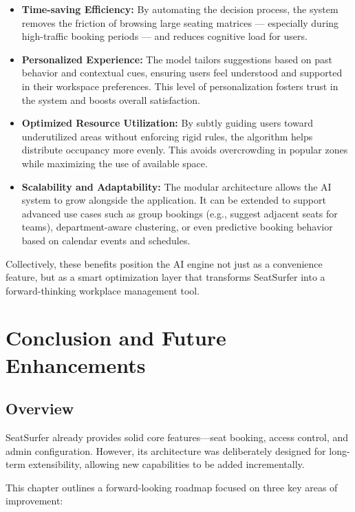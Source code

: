 \documentclass[12pt,a4paper]{report} %
\begin{document}
\begin{itemize}
\item \textbf{Time-saving Efficiency:}
By automating the decision process, the system removes the friction of browsing large seating matrices — especially during high-traffic booking periods — and reduces cognitive load for users.
\item \textbf{Personalized Experience:}  
The model tailors suggestions based on past behavior and contextual cues, ensuring users feel understood and supported in their workspace preferences. This level of personalization fosters trust in the system and boosts overall satisfaction.
\item \textbf{Optimized Resource Utilization:}  
By subtly guiding users toward underutilized areas without enforcing rigid rules, the algorithm helps distribute occupancy more evenly. This avoids overcrowding in popular zones while maximizing the use of available space.
\item \textbf{Scalability and Adaptability:}  
The modular architecture allows the AI system to grow alongside the application. It can be extended to support advanced use cases such as group bookings (e.g., suggest adjacent seats for teams), department-aware clustering, or even predictive booking behavior based on calendar events and schedules.
\end{itemize}

Collectively, these benefits position the AI engine not just as a convenience feature, but as a smart optimization layer that transforms SeatSurfer into a forward-thinking workplace management tool.

\newpage

\chapter*{Conclusion and Future Enhancements}

\section*{Overview}

SeatSurfer already provides solid core features—seat booking, access control, and admin configuration. However, its architecture was deliberately designed for long-term extensibility, allowing new capabilities to be added incrementally.

This chapter outlines a forward-looking roadmap focused on three key areas of improvement:
\end{document}
